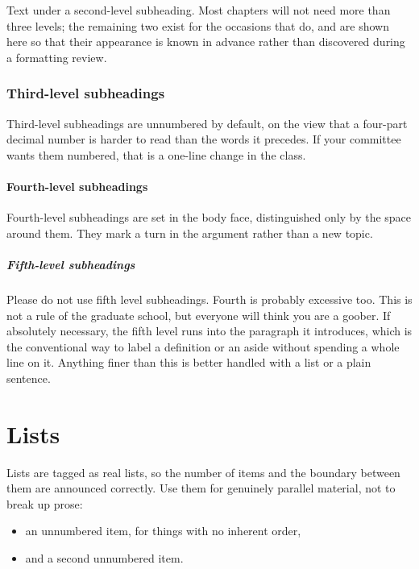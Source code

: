 Text under a second-level subheading. Most chapters will not need more than
three levels; the remaining two exist for the occasions that do, and are shown
here so that their appearance is known in advance rather than discovered
during a formatting review.

\subsubsection{Third-level subheadings}

Third-level subheadings are unnumbered by default, on the view that a
four-part decimal number is harder to read than the words it precedes. If your
committee wants them numbered, that is a one-line change in the class.

\paragraph{Fourth-level subheadings}

Fourth-level subheadings are set in the body face, distinguished only by the
space around them. They mark a turn in the argument rather than a new topic.

\subparagraph{Fifth-level subheadings} Please do not use fifth level subheadings. 
Fourth is probably excessive too. This is not a rule of the graduate school, 
but everyone will think you are a goober. If absolutely necessary, the fifth level 
runs into the paragraph it introduces, which is the conventional way to label a 
definition or an aside without spending a whole line on it. Anything finer than this 
is better handled with a list or a plain sentence.

\section{Lists}
Lists are tagged as real lists, so the number of items and the boundary
between them are announced correctly. Use them for genuinely parallel
material, not to break up prose:

\begin{itemize}
  \item an unnumbered item, for things with no inherent order,
  \item and a second unnumbered item.
\end{itemize}

